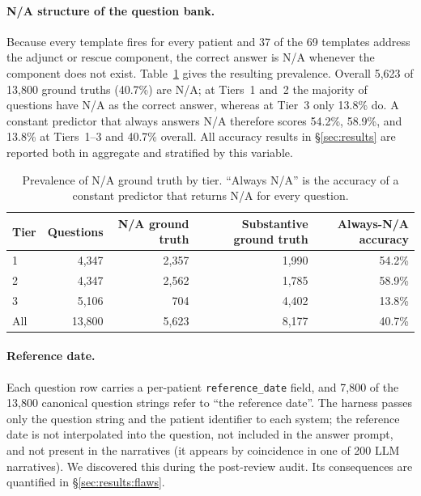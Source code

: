 \paragraph{N/A structure of the question bank.}
Because every template fires for every patient and 37 of the 69 templates address the
adjunct or rescue component, the correct answer is N/A whenever the component does not
exist.  Table~\ref{tab:na_prevalence} gives the resulting prevalence.  Overall 5{,}623 of
13{,}800 ground truths (40.7\%) are N/A; at Tiers~1 and~2 the majority of questions have
N/A as the correct answer, whereas at Tier~3 only 13.8\% do.  A constant predictor that
always answers N/A therefore scores 54.2\%, 58.9\%, and 13.8\% at Tiers~1--3 and 40.7\%
overall.  All accuracy results in \S\ref{sec:results} are reported both in aggregate and
stratified by this variable.

\begin{table}[htbp]
\centering
\caption{Prevalence of N/A ground truth by tier.  ``Always N/A'' is the accuracy of a
constant predictor that returns N/A for every question.}
\label{tab:na_prevalence}
\begin{tabular}{lrrrr}
\toprule
Tier & Questions & N/A ground truth & Substantive ground truth & Always-N/A accuracy \\
\midrule
1 & 4{,}347 & 2{,}357 & 1{,}990 & 54.2\% \\
2 & 4{,}347 & 2{,}562 & 1{,}785 & 58.9\% \\
3 & 5{,}106 &   704   & 4{,}402 & 13.8\% \\
\midrule
All & 13{,}800 & 5{,}623 & 8{,}177 & 40.7\% \\
\bottomrule
\end{tabular}
\end{table}

\paragraph{Reference date.}
Each question row carries a per-patient \texttt{reference\_date} field, and 7{,}800 of the
13{,}800 canonical question strings refer to ``the reference date''.  The harness passes
only the question string and the patient identifier to each system; the reference date
is not interpolated into the question, not included in the answer prompt, and not present
in the narratives (it appears by coincidence in one of 200 LLM narratives).  We discovered
this during the post-review audit.  Its consequences are quantified in
\S\ref{sec:results:flaws}.

